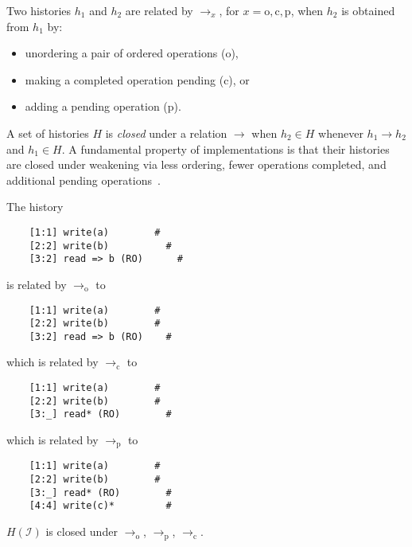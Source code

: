 Two histories $h_1$ and $h_2$ are related by $\to_x$, for $x = \mathrm{o},
\mathrm{c}, \mathrm{p}$, when $h_2$ is obtained from $h_1$ by:
\begin{itemize}

  \item unordering a pair of ordered operations (o),

  \item making a completed operation pending (c), or

  \item adding a pending operation (p).

\end{itemize}
A set of histories $H$ is \emph{closed} under a relation $\to$ when $h_2 \in H$
whenever $h_1 \to h_2$ and $h_1 \in H$. A fundamental property of
implementations is that their histories are closed under weakening via less
ordering, fewer operations completed, and additional pending
operations~\cite{conf/popl/BouajjaniEEH15}.

\begin{example}

  The history
\begin{verbatim}
    [1:1] write(a)        #
    [2:2] write(b)          #
    [3:2] read => b (RO)      #
\end{verbatim}
  is related by $\to_\mathrm{o}$ to 
\begin{verbatim}
    [1:1] write(a)        #
    [2:2] write(b)        #
    [3:2] read => b (RO)    #
\end{verbatim}
which is related by $\to_\mathrm{c}$ to
\begin{verbatim}
    [1:1] write(a)        #
    [2:2] write(b)        #
    [3:_] read* (RO)        #
\end{verbatim}
which is related by $\to_\mathrm{p}$ to
\begin{verbatim}
    [1:1] write(a)        #
    [2:2] write(b)        #
    [3:_] read* (RO)        #
    [4:4] write(c)*         #
\end{verbatim}

\end{example}

\begin{lemma}

  $H(\mathcal{I})$ is closed under $\to_\mathrm{o}$, $\to_\mathrm{p}$, 
  $\to_\mathrm{c}$.
\end{lemma}
